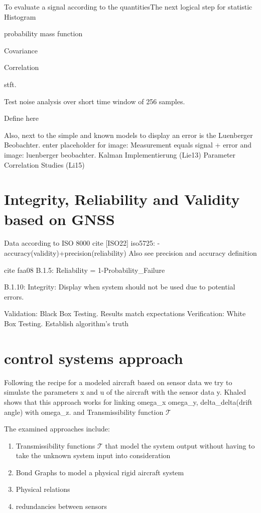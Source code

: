 To evaluate a signal according to the quantitiesThe next logical step for statistic Histogram

probability mass function


Covariance

Correlation


stft.

Test noise analysis over short time window of 256 samples.

Define here





Also, next to the simple and known models to display an error is the Luenberger Beobachter.
enter placeholder for image: Measurement equals signal + error
and image: luenberger beobachter. Kalman Implementierung (Lie13)
Parameter Correlation Studies (Li15)

\section{Integrity, Reliability and Validity based on GNSS}
Data according to ISO 8000 cite [ISO22]
iso5725:
-accuracy(validity)+precision(reliability)
Also see precision and accuracy definition \cite[S.33ff.]{Smith.2006}


cite faa08
B.1.5: Reliability = 1-Probability_Failure

B.1.10: Integrity: Display when system should not be used due to potential errors.

Validation: Black Box Testing. Results match expectations
Verification: White Box Testing. Establish algorithm's truth




\section{control systems approach}

Following the recipe for a modeled aircraft based on sensor data we try to simulate the parameters x and u of the aircraft with the sensor data y. Khaled shows that this approach works for linking omega_x omega_y, delta_delta(drift angle) with omega_z. and Transmissibility function  $\mathcal{T}$


The examined approaches include:
\begin{enumerate}
    \item Transmissibility functions $\mathcal{T}$ that model the system output without having to take the unknown
    system input into consideration
    \item Bond Graphs to model a physical rigid aircraft system
    \item Physical relations
    \item redundancies between sensors
\end{enumerate}

